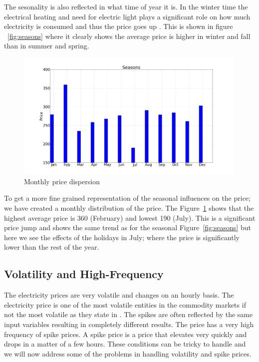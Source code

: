 The sesonality is also reflected in what time of year it is. In the winter time the electrical heating and need for electric light plays a significant role on how much electricity is consumed and thus the price goes up \cite{crowley2005weather}. This is shown in figure ~\ref{fig:seasons} where it clearly shows the average price is higher in winter and fall than in summer and spring.

\begin{figure}[H]
\centering
\includegraphics[width=0.99\textwidth ]{billeder/energy_price_plots/averageMonthlyPrice.png}
\caption{Monthly price dispersion}
\label{fig:monthlyAveragePrice}
\end{figure}

To get a more fine grained representation of the seasonal influences on the price; we have created a monthly distribution of the price. The Figure~\ref{fig:monthlyAveragePrice} shows that the highest average price is 360 (February) and lowest 190 (July). This is a significant price jump and shows the same trend as for the seasonal Figure~\ref{fig:seasons} but here we see the effects of the holidays in July; where the price is significantly lower than the rest of the year.

\subsection{Volatility and High-Frequency}
\label{sec:volatility}
The electricity prices are very volatile and changes on an hourly basis. The electricity price is one of the most volatile entities in the commodity markets \cite{pjmForecast} if not the most volatile as they state in \cite{yamin2004adaptive}. The spikes are often reflected by the same input variables resulting in completely different results. The price has a very high frequency of spike prices. A spike price is a price that elevates very quickly and drops in a matter of a few hours. These conditions can be tricky to handle and we will now address some of the problems in handling volatility and spike prices.

